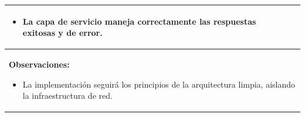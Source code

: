 \begin{table}[H]
\begin{center}
\begin{tabularx}{\textwidth}{|l|X|l|}
{\begin{itemize}
                    \item La capa de servicio maneja correctamente las respuestas exitosas y de error.
                \end{itemize}
            }\\
            \hline
            \multicolumn{3}{|p{\textwidth}|}{
                \textbf{Observaciones:}
                \begin{itemize}
                    \item La implementación seguirá los principios de la arquitectura limpia, aislando la infraestructura de red.
                \end{itemize}
            }\\
            \hline
        \end{tabularx}
    \end{center}
\end{table}

